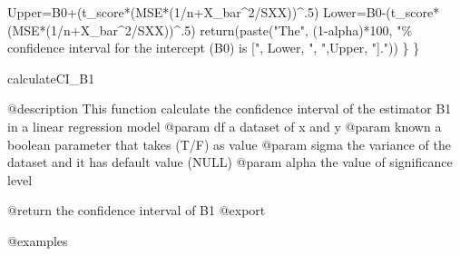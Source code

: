 \documentclass[
]{article}
\newenvironment{Shaded}{\begin{snugshade}}{\end{snugshade}}
\newcommand{\DecValTok}[1]{\textcolor[rgb]{0.00,0.00,0.81}{#1}}
\newcommand{\FunctionTok}[1]{\textcolor[rgb]{0.00,0.00,0.00}{#1}}
\newcommand{\NormalTok}[1]{#1}
\newcommand{\OtherTok}[1]{\textcolor[rgb]{0.56,0.35,0.01}{#1}}
\newcommand{\SpecialCharTok}[1]{\textcolor[rgb]{0.00,0.00,0.00}{#1}}
\newcommand{\StringTok}[1]{\textcolor[rgb]{0.31,0.60,0.02}{#1}}
\begin{document}
\begin{Shaded}
\begin{Highlighting}[]
\NormalTok{    Upper}\OtherTok{=}\NormalTok{B0}\SpecialCharTok{+}\NormalTok{(t\_score}\SpecialCharTok{*}\NormalTok{(MSE}\SpecialCharTok{*}\NormalTok{(}\DecValTok{1}\SpecialCharTok{/}\NormalTok{n}\SpecialCharTok{+}\NormalTok{X\_bar}\SpecialCharTok{\^{}}\DecValTok{2}\SpecialCharTok{/}\NormalTok{SXX))}\SpecialCharTok{\^{}}\NormalTok{.}\DecValTok{5}\NormalTok{)}
\NormalTok{    Lower}\OtherTok{=}\NormalTok{B0}\SpecialCharTok{{-}}\NormalTok{(t\_score}\SpecialCharTok{*}\NormalTok{(MSE}\SpecialCharTok{*}\NormalTok{(}\DecValTok{1}\SpecialCharTok{/}\NormalTok{n}\SpecialCharTok{+}\NormalTok{X\_bar}\SpecialCharTok{\^{}}\DecValTok{2}\SpecialCharTok{/}\NormalTok{SXX))}\SpecialCharTok{\^{}}\NormalTok{.}\DecValTok{5}\NormalTok{)}
    \FunctionTok{return}\NormalTok{(}\FunctionTok{paste}\NormalTok{(}\StringTok{"The"}\NormalTok{, (}\DecValTok{1}\SpecialCharTok{{-}}\NormalTok{alpha)}\SpecialCharTok{*}\DecValTok{100}\NormalTok{, }\StringTok{"\% confidence interval for the intercept (B0) is ["}\NormalTok{, Lower, }\StringTok{", "}\NormalTok{,Upper, }\StringTok{"]."}\NormalTok{))}
\NormalTok{  \}}
\NormalTok{\}  }
\end{Highlighting}
\end{Shaded}

calculateCI\_B1

@description This function calculate the confidence interval of the
estimator B1 in a linear regression model @param df a dataset of x and y
@param known a boolean parameter that takes (T/F) as value @param sigma
the variance of the dataset and it has default value (NULL) @param alpha
the value of significance level

@return the confidence interval of B1 @export

@examples
\end{document}
